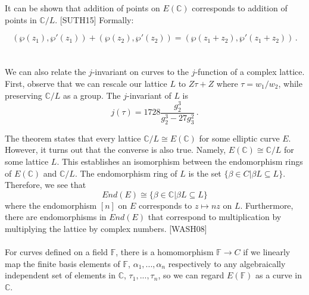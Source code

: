 \documentclass[12pt,twoside]{article}
\begin{document}
\noindent It can be shown that addition of points on $E(\mathbb C)$ corresponds to addition of points in $\mathbb C/L$. [SUTH15] Formally:

\begin{equation} 
\left( \wp(z_{1}), \wp'(z_{1}) \right) + \left( \wp(z_{2}), \wp'(z_{2}) \right) = \left( \wp(z_{1} + z_{2}), \wp'(z_{1} + z_{2}) \right) \, .
\end{equation} \\ \\
\noindent  We can also relate the $j$-invariant on curves to the $j$-function of a complex lattice. First, observe that we can rescale our lattice $L$ to $Z\tau + Z$ where $\tau = {w_{1}}/{w_{2}}$, while preserving $\mathbb C/L$ as a group. The $j$-invariant of $L$ is
\begin{equation}
j(\tau) = 1728 \frac{g_{2}^{3}}{g_{2}^{3} - 27 g_{3}^{2}} \, .
\end{equation} 

 
\noindent The theorem states that every lattice $\mathbb C/L \cong E(\mathbb C)$ for some elliptic curve $E$. However, it turns out that the converse is also true. Namely, $E(\mathbb C) \cong \mathbb C/L$ for some lattice $L$. This establishes an isomorphism between the endomorphism rings of $E(\mathbb C)$ and $\mathbb C/L$. The endomorphism ring of $L$ is the set $\{ \beta \in C | \beta L \subseteq L \}$. Therefore, we see that
\begin{equation}
End(E) \cong \{ \beta \in \mathbb C | \beta L \subseteq L \} 
\end{equation}  
where the endomorphism $[n]$ on $E$ corresponds to $z \mapsto nz$ on $L$. Furthermore, there are endomorphisms in $End(E)$ that correspond to multiplication by multiplying the lattice by complex numbers. [WASH08]
\\ \\
\noindent For curves defined on a field $\mathbb F$, there is a homomorphism $\mathbb F \rightarrow C$ if we linearly map the finite basis elements of $\mathbb F$, $\alpha_{1}, ...,\alpha_{n}$ respectively to any algebraically independent set of elements in $\mathbb{C}$, $\tau_{1},..., \tau_{n}$, so we can regard $E(\mathbb F)$ as a curve in $\mathbb{C}$.  
\end{document}
